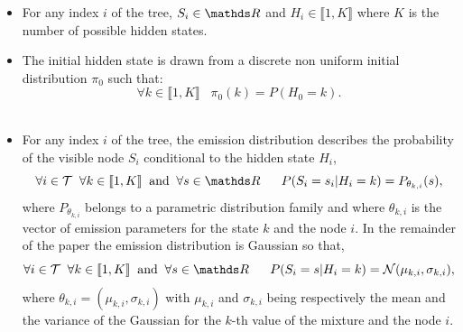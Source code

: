 \documentclass[a4paper,11pt]{report}
\begin{document}
    \begin{itemize}
      \item For any index $i$ of the tree, $S_{i} \in \dsR$ and $H_{i} \in \llbracket 1,K \rrbracket$ where $K$ is the number of possible hidden states.\\
      
      \item The initial hidden state is drawn from a discrete non uniform initial distribution $\pi_{0}$ such that:
	  	  \begin{equation}
					\forall k \in \llbracket 1,K \rrbracket \;\;\; \pi_{0}(k) = P(H_{0}=k).
					\label{eq:SCHMT - initial distribution}
				\end{equation}\\
				
      \item For any index $i$ of the tree, the emission distribution describes the probability of the visible node $S_{i}$ conditional to the hidden state $H_{i}$,
				\begin{equation}
				  \forall i \in \mcalT \;\; \forall k \in \llbracket1,K\rrbracket \;\; \text{and} \;\; \forall s \in \dsR
					\;\;\;\;\;\; P(S_{i}=s_{i}|H_{i}=k) = P_{\theta_{k,i}}(s),
					\label{eq:SCHMT - Emission distr}
				\end{equation}
			where $P_{\theta_{k,i}}$ belongs to a parametric distribution family and where $\theta_{k,i}$ is the vector of emission parameters for the state $k$ and the node $i$. In the remainder of the paper the emission distribution is Gaussian so that,  
      	\begin{equation}
				  \forall i \in \mcalT \;\; \forall k \in \llbracket1,K\rrbracket \;\; \text{and} \;\; \forall s \in \dsR
					\;\;\;\;\;\; P(S_{i}=s | H_{i}=k) = \mcalN(\mu_{k,i},\sigma_{k,i}),
				  \label{eq:SCHMT - Mixt of Gaussian}
				\end{equation}
				where $\theta_{k,i}=(\mu_{k,i},\sigma_{k,i})$ with $\mu_{k,i}$ and $\sigma_{k,i}$ being respectively the mean and the variance of the Gaussian for the $k$-th value of the mixture and the node $i$.\\
				

\end{itemize}
\end{document}
